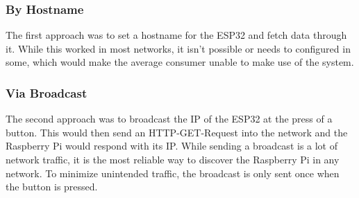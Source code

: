         \subsubsection{By Hostname}
        The first approach was to set a hostname for the 
        ESP32 and fetch data through it. While this worked
        in most networks, it isn't possible or needs to 
        configured in some, which would make the average 
        consumer unable to make use of the system.

        \subsubsection{Via Broadcast}
        The second approach was to broadcast the IP of the ESP32
        at the press of a button. This would then send an 
        HTTP-GET-Request into the network and the Raspberry Pi
        would respond with its IP. While sending a broadcast is
        a lot of network traffic, it is the most reliable way
        to discover the Raspberry Pi in any network. To minimize
        unintended traffic, the broadcast is only sent once when the
        button is pressed.